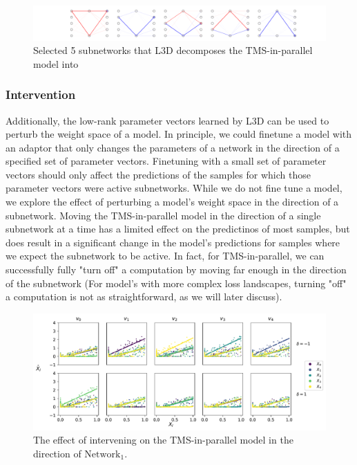 \documentclass{article}
\theoremstyle{plain}
\theoremstyle{definition}
\theoremstyle{remark}
\begin{document}
\begin{figure}
    \centerline{\includegraphics[width=\textwidth]{../figures/3_tms_first_5_subnetworks.pdf}}
    \centering
    \caption{Selected 5 subnetworks that L3D decomposes the TMS-in-parallel model into}\label{fig:3_tms_subnetworks_first5}
\end{figure}


\subsubsection{Intervention}


Additionally, the low-rank parameter vectors learned by L3D can be used to perturb the weight space of a model. In principle, we could finetune a model with an adaptor that only changes the parameters of a network in the direction of a specified set of parameter vectors. Finetuning with a small set of parameter vectors should only affect the predictions of the samples for which those parameter vectors were active subnetworks. While we do not fine tune a model, we explore the effect of perturbing a model's weight space in the direction of a subnetwork. Moving the TMS-in-parallel model in the direction of a single subnetwork at a time has a limited effect on the predictinos of most samples, but does result in a significant change in the model's predictions for samples where we expect the subnetwork to be active. In fact, for TMS-in-parallel, we can successfully fully "turn off" a computation by moving far enough in the direction of the subnetwork (For model's with more complex loss landscapes, turning "off" a computation is not as straightforward, as we will later discuss).

\begin{figure}
    \centerline{\includegraphics[width=\columnwidth]{../figures/4_tms_intervention.pdf}}
    \centering
    \caption{The effect of intervening on the TMS-in-parallel model in the direction of $\text{Network}_1$.}\label{fig:4_tms_intervention}
\end{figure}
\end{document}
